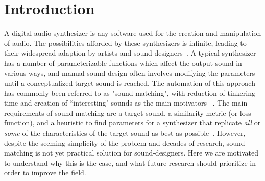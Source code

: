 \section{Introduction}


A digital audio synthesizer is any software used for the creation and manipulation of audio. The possibilities afforded by these synthesizers is infinite, leading to their widespread adaption by artists and sound-designers~\cite{lyons1997understanding,russ1999sound,stranneby2004digital}. A typical synthesizer has a number of parameterizable functions which affect the output sound in various ways, and manual sound-design often involves modifying the parameters until a conceptualized target sound is reached. The automation of this approach has commonly been referred to as "sound-matching", with reduction of tinkering time and creation of ``interesting" sounds as the main motivators ~\cite{krekovic2019insights,turian2020sorry,horner1993machine,salimi2020make,esling2019flow,engel2020ddsp,mitchell2007evolutionary,shier2020spiegelib,masuda2021soundmatch,masuda2023improving}. The main requirements of sound-matching are a target sound, a similarity metric (or loss function), and a heuristic to find parameters for a synthesizer that replicate \textit{all} or \textit{some} of the characteristics of the target sound as best as possible~\cite{horner1993machine,mitchell2007evolutionary,masuda2023improving}. However, despite the seeming simplicity of the problem and decades of research, sound-matching is not yet practical solution for sound-designers. Here we are motivated to understand why this is the case, and what future research should prioritize in order to improve the field. 

